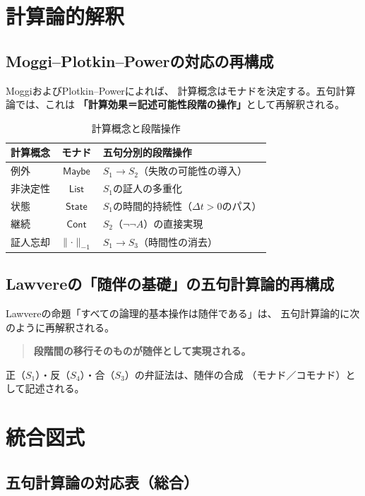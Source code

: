 \documentclass[11pt,a4paper]{ltjsarticle}
\theoremstyle{remark}
\newcommand{\Maybe}{\mathsf{Maybe}}
\newcommand{\List}{\mathsf{List}}
\newcommand{\State}{\mathsf{State}}
\newcommand{\Cont}{\mathsf{Cont}}
\begin{document}
\section{計算論的解釈}

\subsection{Moggi--Plotkin--Powerの対応の再構成}

Moggi\cite{Moggi1991}およびPlotkin--Power\cite{PlotkinPower2002}によれば、
計算概念はモナドを決定する。五句計算論では、これは
\textbf{「計算効果＝記述可能性段階の操作」}として再解釈される。

\begin{table}[htbp]
\centering
\caption{計算概念と段階操作}
\label{tab:computation}
\small
\begin{tabularx}{\textwidth}{@{}l c >{\raggedright\arraybackslash}X@{}}
\toprule
計算概念 & モナド & 五句分別的段階操作 \\
\midrule
例外 & $\Maybe$ & $S_1\to S_2$（失敗の可能性の導入） \\
非決定性 & $\List$ & $S_1$の証人の多重化 \\
状態 & $\State$ & $S_1$の時間的持続性（$\Delta t>0$のパス） \\
継続 & $\Cont$ & $S_2$（$\neg\neg A$）の直接実現 \\
証人忘却 & $\lVert\mathord{\cdot}\rVert_{-1}$ & $S_1\to S_3$（時間性の消去） \\
\bottomrule
\end{tabularx}
\end{table}

\subsection{Lawvereの「随伴の基礎」の五句計算論的再構成}

Lawvere\cite{Lawvere1967}の命題「すべての論理的基本操作は随伴である」は、
五句計算論的に次のように再解釈される。
\begin{quote}
\textbf{段階間の移行そのものが随伴として実現される。}
\end{quote}
正（$S_1$）・反（$S_4$）・合（$S_3$）の弁証法は、随伴の合成
（モナド／コモナド）として記述される。

\section{統合図式}

\subsection{五句計算論の対応表（総合）}
\end{document}
